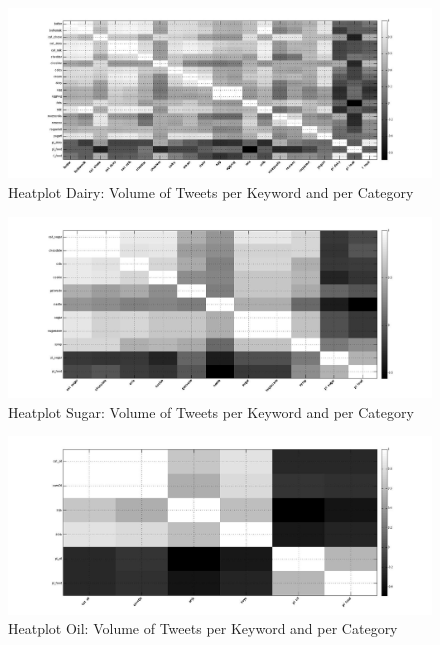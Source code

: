 \begin{figure}[H]
        \centering
         \includegraphics[width=1\textwidth ]{img/anal/dairy_test}
              
        \caption{Heatplot Dairy: Volume of Tweets per Keyword and per Category}
        \label{fig:distribution}
\end{figure}
 

\begin{figure}[H]
        \centering
         \includegraphics[width=1\textwidth ]{img/anal/sugar_black}
              
        \caption{Heatplot Sugar: Volume of Tweets per Keyword and per Category}
        \label{fig:sugar_heat}
\end{figure}

\begin{figure}[H]
        \centering
         \includegraphics[width=1\textwidth ]{img/anal/black_oil}
              
        \caption{Heatplot Oil: Volume of Tweets per Keyword and per Category}
        \label{fig:oil_heat}
\end{figure}



